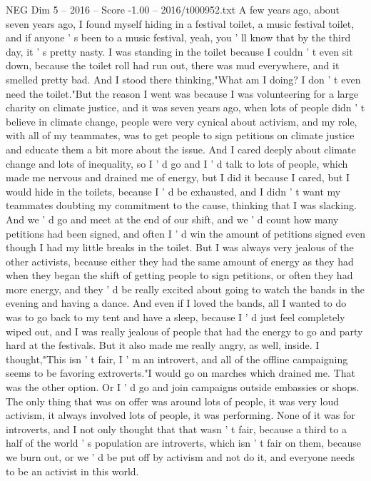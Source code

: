 \begin{textsample}{NEG Dim 5 – 2016 – Score -1.00 – 2016/t000952.txt}  \label{ex:f5_neg_025}
A few years ago, about seven years ago, I found myself hiding in a festival toilet, a music festival toilet, and if anyone ' s been to a music festival, yeah, you ' ll know that by the third day, it ' s pretty nasty.
I was standing in the toilet because I couldn ' t even sit down, because the toilet roll had run out, there was mud everywhere, and it smelled pretty bad.
And I stood there thinking,"What am I doing?
I don ' t even need the toilet."But the reason I went was because I was volunteering for a large charity on climate justice, and it was seven years ago, when lots of people didn ' t believe in climate change, people were very cynical about activism, and my role, with all of my teammates, was to get people to sign petitions on climate justice and educate them a bit more about the issue.
And I cared deeply about climate change and lots of inequality, so I ' d go and I ' d talk to lots of people, which made me nervous and drained me of energy, but I did it because I cared, but I would hide in the toilets, because I ' d be exhausted, and I didn ' t want my teammates doubting my commitment to the cause, thinking that I was slacking.
And we ' d go and meet at the end of our shift, and we ' d count how many petitions had been signed, and often I ' d win the amount of petitions signed even though I had my little breaks in the toilet.
But I was always very jealous of the other activists, because either they had the same amount of energy as they had when they began the shift of getting people to sign petitions, or often they had more energy, and they ' d be really excited about going to watch the bands in the evening and having a dance.
And even if I loved the bands, all I wanted to do was to go back to my tent and have a sleep, because I ' d just feel completely wiped out, and I was really jealous of people that had the energy to go and party hard at the festivals.
But it also made me really angry, as well, inside.
I thought,"This isn ' t fair, I ' m an introvert, and all of the offline campaigning seems to be favoring extroverts."I would go on marches which drained me.
That was the other option.
Or I ' d go and join campaigns outside embassies or shops.
The only thing that was on offer was around lots of people, it was very loud activism, it always involved lots of people, it was performing.
None of it was for introverts, and I not only thought that that wasn ' t fair, because a third to a half of the world ' s population are introverts, which isn ' t fair on them, because we burn out, or we ' d be put off by activism and not do it, and everyone needs to be an activist in this world.

\end{textsample}
